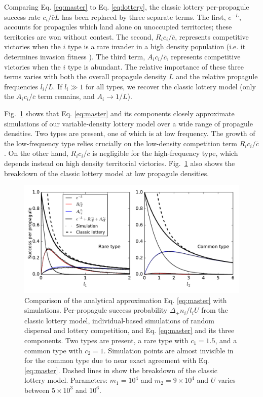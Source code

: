 \documentclass[12pt]{article}
\begin{document}
Comparing Eq. \eqref{eq:master} to Eq. \eqref{eq:lottery}, the classic lottery per-propagule success rate $c_i/\overline{c}L$ has been replaced by three separate terms. The first, $e^{-L}$, accounts for propagules which land alone on unoccupied territories; these territories are won without contest. The second, $R_i c_i/\overline{c}$, represents competitive victories when the $i$ type is a rare invader in a high density population (i.e. it determines invasion fitness \citep{metz_1992}). The third term, $A_i c_i/\overline{c}$, represents competitive victories when the $i$ type is abundant. The relative importance of these three terms varies with both the overall propagule density $L$ and the relative propagule frequencies $l_i/L$. If $l_i\gg 1$ for all types, we recover the classic lottery model (only the $A_ic_i/\overline{c}$ term remains, and $A_i\rightarrow 1/L$). 

Fig.~\ref{fig:simcomp} shows that Eq. \eqref{eq:master} and its components closely approximate simulations of our variable-density lottery model over a wide range of propagule densities. Two types are present, one of which is at low frequency. The growth of the low-frequency type relies crucially on the low-density competition term $R_i c_i/\overline{c}$. On the other hand, $R_i c_i/\overline{c}$ is negligible for the high-frequency type, which depends instead on high density territorial victories. Fig.~\ref{fig:simcomp} also shows the breakdown of the classic lottery model at low propagule densities.

\begin{figure}
\centering
\includegraphics[scale=0.8]{simulationcomparison.pdf}
\caption{\label{fig:simcomp} Comparison of the analytical approximation Eq. \eqref{eq:master} with simulations. Per-propagule success probability $\Delta_+ n_i/l_i U$ from the classic lottery model, individual-based simulations of random dispersal and lottery competition, and Eq. \eqref{eq:master} and its three components. Two types are present, a rare type with $c_1=1.5$, and a common type with $c_2=1$. Simulation points are almost invisible in for the common type due to near exact agreement with Eq. \eqref{eq:master}. Dashed lines in show the breakdown of the classic lottery model. Parameters: $m_1=10^4$ and $m_2=9\times 10^4$ and $U$ varies between $5\times 10^3$ and $10^6$.} 
\end{figure}
\end{document}
